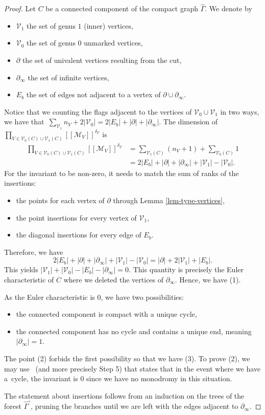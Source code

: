 \documentclass[pdftex]{sigma}
\newcommand{\fvir}[2]{[\![ #1 ]\!]^{#2}}
\newcommand{\M}{\mathcal{M}}
\newcommand{\V}{\mathcal{V}}
\numberwithin{equation}{section}
\theoremstyle{definition}
\begin{document}
\begin{proof}
 Let $C$ be a connected component of the compact graph $\widehat{\Gamma}$. We denote by
 \begin{itemize}\itemsep=0pt
 \item $\V_1$ the set of genus $1$ (inner) vertices,
 \item $\V_0$ the set of genus $0$ unmarked vertices,
 \item $\partial$ the set of univalent vertices resulting from the cut,
 \item $\partial_\infty$ the set of infinite vertices,
 \item $E_b$ the set of edges not adjacent to a vertex of $\partial\cup\partial_\infty$.
 \end{itemize}
 Notice that we counting the flags adjacent to the vertices of $\V_0\cup\V_1$ in two ways, we have that~${\sum_{\V_1}n_V +2|\V_0| = 2|E_b|+|\partial|+|\partial_\infty|}$.
 The dimension of $\prod_{V\in \V_0(C)\cup \V_1(C)}\fvir{\M_V}{\delta_\Gamma}$ is
 \begin{align*}
 \prod_{V\in \V_0(C)\cup \V_1(C)}\fvir{\M_V}{\delta_\Gamma} &=  \sum_{\V_1(C)} (n_V+1) + \sum_{\V_0(C)} 1  \\
& =   2|E_b|+|\partial|+|\partial_\infty| +|\V_1|-|\V_0| .
 \end{align*}
 For the invariant to be non-zero, it needs to match the sum of ranks of the insertions:
 \begin{itemize}\itemsep=0pt
 \item the points for each vertex of $\partial$ through Lemma \ref{lem-type-vertices},
 \item the point insertions for every vertex of $\V_1$,
 \item the diagonal insertions for every edge of $E_b$.
 \end{itemize}
 Therefore, we have
 \[ 2|E_b|+|\partial|+|\partial_\infty| +|\V_1|-|\V_0|= |\partial|+2|\V_1|+|E_b|. \]
 This yields
$|\V_1|+|\V_0|-|E_b| -|\partial_\infty|=0$.
 This quantity is precisely the Euler characteristic of $C$ where we deleted the vertices of $\partial_\infty$. Hence, we have (1).



 As the Euler characteristic is $0$, we have two possibilities:
 \begin{itemize}\itemsep=0pt
 \item the connected component is compact with a unique cycle,
 \item the connected component has no cycle and contains a unique end, meaning $|\partial_\infty|=1$.
 \end{itemize}

 The point (2) forbids the first possibility so that we have (3). To prove (2), we may use~\cite[Proposition 4.17]{blomme2024bielliptic} (and more precisely Step 5) that states that in the event where we have a~cycle, the invariant is $0$ since we have no monodromy in this situation.

 The statement about insertions follows from an induction on the trees of the forest $\widehat{\Gamma}^\circ$, pruning the branches until we are left with the edges adjacent to $\partial_\infty$.
\end{proof}
\end{document}
